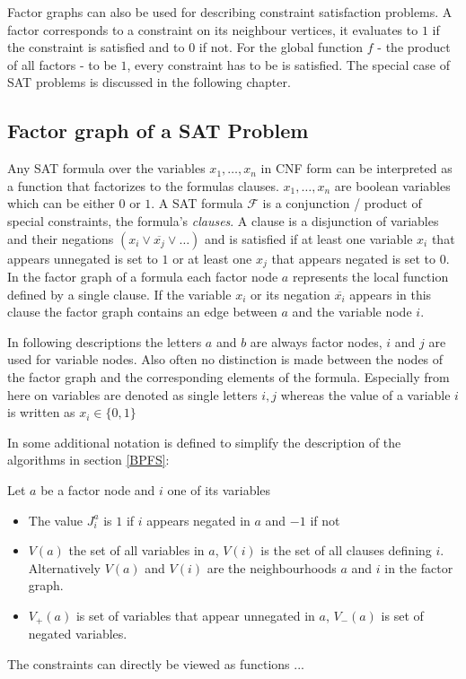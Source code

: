 \newpage
Factor graphs can also be used for describing constraint satisfaction problems. A factor corresponds to a constraint on its neighbour vertices, it evaluates to $1$ if the constraint is satisfied and to $0$ if not. For the global function $f$ - the product of all factors - to be $1$, every constraint has to be is satisfied. The special case of SAT problems is discussed in the following chapter.



\subsection{Factor graph of a SAT Problem}
Any SAT formula over the variables $x_1, \ldots, x_n$ in CNF form can be interpreted as a function that factorizes to the formulas clauses. \newline
$x_1, \ldots, x_n$ are boolean variables which can be either $0$ or $1$. A SAT formula $\mathcal{F}$ is a conjunction / product of special constraints, the formula's \emph{clauses}. A clause is a disjunction of variables and their negations  $(x_i\lor \overline{x_j} \lor \ldots)$ and is satisfied if at least one variable $x_i$ that appears unnegated is set to $1$ or at least one $x_j$ that appears negated is set to $0$. \newline
In the factor graph of a formula each factor node $a$ represents the local function defined by a single clause. If the variable $x_i$ or its negation $\overline{x_i}$ appears in this clause the factor graph contains an edge between $a$ and the variable node $i$. 

In following descriptions the letters $a$ and $b$ are always factor nodes, $i$ and $j$ are used for variable nodes. Also often no distinction is made between the nodes of the factor graph and the corresponding elements of the formula. Especially from here on variables are denoted as single letters $i, j$ whereas the value of a variable $i$ is written as $x_i \in \{0, 1\}$

In \cite{survprob} some additional notation is defined to simplify the description of the algorithms in section \ref{BPFS}: 
\newpage
\begin{definition} Let $a$ be a factor node and $i$ one of its variables
\begin{itemize}
\item The value $J_i^a$ is $1$ if $i$ appears negated in $a$ and $-1$ if not
\item $V(a)$ the set of all variables in $a$, $V(i)$ is the set of all clauses defining $i$.  Alternatively $V(a)$ and $V(i)$ are the neighbourhoods $a$ and $i$ in the factor graph.
\item $V_+(a)$ is set of variables that appear unnegated in $a$, $V_-(a)$ is set of negated variables.
\end{itemize}
\end{definition}
The constraints can directly be viewed as functions ...


